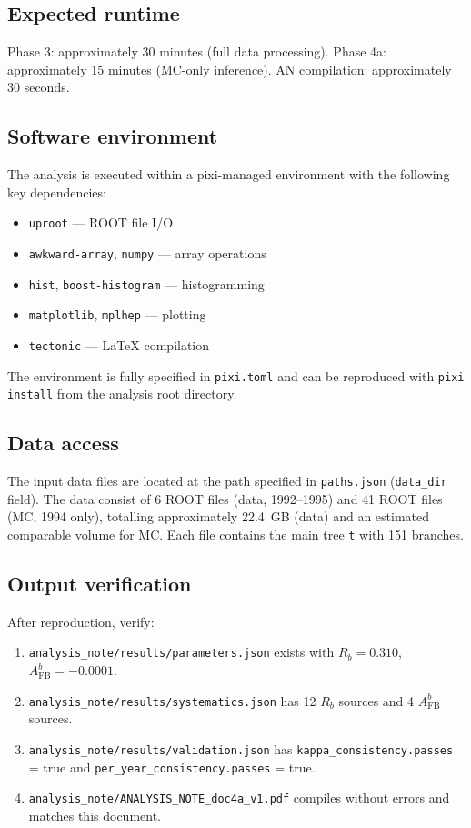 \documentclass[11pt,a4paper]{article}
\begin{document}
\subsection{Expected runtime}

Phase 3: approximately 30 minutes (full data processing).
Phase 4a: approximately 15 minutes (MC-only inference).
AN compilation: approximately 30 seconds.

\subsection{Software environment}

The analysis is executed within a pixi-managed environment with the following key
dependencies:
\begin{itemize}
\item \texttt{uproot} --- ROOT file I/O
\item \texttt{awkward-array}, \texttt{numpy} --- array operations
\item \texttt{hist}, \texttt{boost-histogram} --- histogramming
\item \texttt{matplotlib}, \texttt{mplhep} --- plotting
\item \texttt{tectonic} --- LaTeX compilation
\end{itemize}

The environment is fully specified in \texttt{pixi.toml} and can be reproduced
with \texttt{pixi install} from the analysis root directory.

\subsection{Data access}

The input data files are located at the path specified in \texttt{paths.json}
(\texttt{data\_dir} field). The data consist of 6 ROOT files (data, 1992--1995)
and 41 ROOT files (MC, 1994 only), totalling approximately 22.4~GB (data) and
an estimated comparable volume for MC. Each file contains the main tree \texttt{t}
with 151 branches.

\subsection{Output verification}

After reproduction, verify:
\begin{enumerate}
\item \texttt{analysis\_note/results/parameters.json} exists with
$R_b = 0.310$, $A_\mathrm{FB}^b = -0.0001$.
\item \texttt{analysis\_note/results/systematics.json} has 12 $R_b$ sources
and 4 $A_\mathrm{FB}^b$ sources.
\item \texttt{analysis\_note/results/validation.json} has
\texttt{kappa\_consistency.passes} = true and
\texttt{per\_year\_consistency.passes} = true.
\item \texttt{analysis\_note/ANALYSIS\_NOTE\_doc4a\_v1.pdf} compiles without
errors and matches this document.
\end{enumerate}
\end{document}

